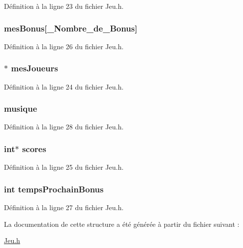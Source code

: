 Définition à la ligne 23 du fichier Jeu.\-h.

\hypertarget{struct_jeu_a9ba9a1f879502d127ed00db670605ac7}{
\subsubsection[{mes\-Bonus}]{ mes\-Bonus\mbox{[}{\bf \-\_\-\-Nombre\-\_\-de\-\_\-\-Bonus}\mbox{]}}}\label{struct_jeu_a9ba9a1f879502d127ed00db670605ac7}


Définition à la ligne 26 du fichier Jeu.\-h.

\hypertarget{struct_jeu_a632589b4fe33211e88d71bab5b8fecb1}{
\subsubsection[{mes\-Joueurs}]{$\ast$ mes\-Joueurs}}\label{struct_jeu_a632589b4fe33211e88d71bab5b8fecb1}


Définition à la ligne 24 du fichier Jeu.\-h.

\hypertarget{struct_jeu_aa0f1b7578210c2739aee880842d2fa27}{
\subsubsection[{musique}]{ musique}}\label{struct_jeu_aa0f1b7578210c2739aee880842d2fa27}


Définition à la ligne 28 du fichier Jeu.\-h.

\hypertarget{struct_jeu_a859dd84beee150c7f6f6e683f1dc91ac}{
\subsubsection[{scores}]{\setlength{\rightskip}{0pt plus 5cm}int$\ast$ scores}}\label{struct_jeu_a859dd84beee150c7f6f6e683f1dc91ac}


Définition à la ligne 25 du fichier Jeu.\-h.

\hypertarget{struct_jeu_a9691871ea592a3579dcc143a4730aa08}{
\subsubsection[{temps\-Prochain\-Bonus}]{\setlength{\rightskip}{0pt plus 5cm}int temps\-Prochain\-Bonus}}\label{struct_jeu_a9691871ea592a3579dcc143a4730aa08}


Définition à la ligne 27 du fichier Jeu.\-h.



La documentation de cette structure a été générée à partir du fichier suivant \-:\begin{DoxyCompactItemize}
\item 
\hyperlink{_jeu_8h}{Jeu.\-h}\end{DoxyCompactItemize}
